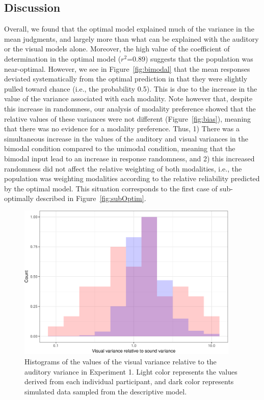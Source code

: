 \documentclass[english,man]{apa6}
\theoremstyle{definition}
\theoremstyle{definition}
\theoremstyle{definition}
\theoremstyle{remark}
\begin{document}
\subsection{Discussion}\label{discussion}

Overall, we found that the optimal model explained much of the variance
in the mean judgments, and largely more than what can be explained with
the auditory or the visual models alone. Moreover, the high value of the
coefficient of determination in the optimal model (\(r^2\)=0.89)
suggests that the population was near-optimal. However, we see in
Figure~\ref{fig:bimodal} that the mean responses deviated systematically
from the optimal prediction in that they were slightly pulled toward
chance (i.e., the probability 0.5). This is due to the increase in the
value of the variance associated with each modality. Note however that,
despite this increase in randomness, our analysis of modality preference
showed that the relative values of these variances were not different
(Figure~\ref{fig:bias}), meaning that there was no evidence for a
modality preference. Thus, 1) There was a simultaneous increase in the
values of the auditory and visual variances in the bimodal condition
compared to the unimodal condition, meaning that the bimodal input lead
to an increase in response randomness, and 2) this increased randomness
did not affect the relative weighting of both modalities, i.e., the
population was weighting modalities according to the relative
reliability predicted by the optimal model. This situation corresponds
to the first case of sub-optimally described in
Figure~\ref{fig:subOptim}.

\begin{figure}

{\centering \includegraphics[width=400px]{ms_files/figure-latex/individual-1} 

}

\caption{Histograms of the values of the visual variance relative to the auditory variance in Experiment 1. Light color represents the values derived from each individual participant, and dark color represents simulated data sampled from the descriptive model.}\label{fig:individual}
\end{figure}
\end{document}

